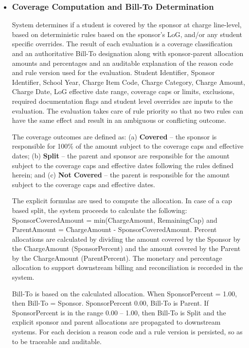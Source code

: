 \begin{itemize}
        \item \subsubsection{Coverage Computation and \textbf{Bill-To} Determination}
        
        System determines if a student is covered by the sponsor at charge line-level, based on deterministic rules based on the sponsor's LoG, and/or any student specific overrides. The result of each evaluation is a coverage classification and an authoritative Bill-To designation along with sponsor-parent allocation amounts and percentages and an auditable explanation of the reason code and rule version used for the evaluation. Student Identifier, Sponsor Identifier, School Year, Charge Item Code, Charge Category, Charge Amount, Charge Date, LoG effective date range, coverage caps or limits, exclusions, required documentation flags and student level overrides are inputs to the evaluation. The evaluation takes care of rule priority so that no two rules can have the same effect and result in an ambiguous or conflicting outcome.
        
        The coverage outcomes are defined as: (a) \textbf{Covered} – the sponsor is responsible for 100\% of the amount subject to the coverage caps and effective dates; (b) \textbf{Split} – the parent and sponsor are responsible for the amount subject to the coverage caps and effective dates following the rules defined herein; and (c) \textbf{Not Covered} – the parent is responsible for the amount subject to the coverage caps and effective dates.
        
        The explicit formulas are used to compute the allocation. In case of a cap based split, the system proceeds to calculate the following: SponsorCoveredAmount = min(ChargeAmount, RemainingCap) and ParentAmount = ChargeAmount - SponsorCoveredAmount. Percent allocations are calculated by dividing the amount covered by the Sponsor by the ChargeAmount (SponsorPercent) and the amount covered by the Parent by the ChargeAmount (ParentPercent). The monetary and percentage allocation to support downstream billing and reconciliation is recorded in the system.
        
        Bill-To is based on the calculated allocation. When SponsorPercent = 1.00, then Bill-To = Sponsor. SponsorPercent 0.00, Bill-To is Parent. If SponsorPercent is in the range 0.00 – 1.00, then Bill-To is Split and the explicit sponsor and parent allocations are propagated to downstream systems. For each decision a reason code and a rule version is persisted, so as to be traceable and auditable.
        

\end{itemize}
